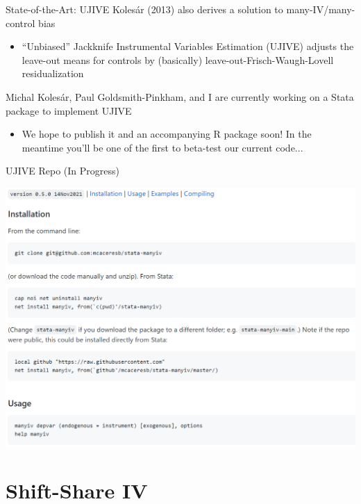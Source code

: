 \documentclass{beamer}
\begin{document}
\begin{frame}{State-of-the-Art: UJIVE}
 Koles\'{a}r (2013) also derives a solution to many-IV/many-control bias \smallskip
\begin{itemize}
\item ``Unbiased'' Jackknife Instrumental Variables Estimation (UJIVE) adjusts the leave-out means for controls by (basically) leave-out-Frisch-Waugh-Lovell residualization
\end{itemize}\bigskip\pause{}
Michal Koles\'{a}r, Paul Goldsmith-Pinkham, and I are currently working on a Stata package to implement UJIVE  \smallskip
\begin{itemize}
\item We hope to publish it and an accompanying R package soon! In the meantime you'll be one of the first to beta-test our current code...
\end{itemize}
\end{frame}

\begin{frame}{UJIVE Repo (In Progress)}
\begin{center}
\includegraphics[scale=0.45]{./lecture_includes/manyiv.png}
\end{center}
\end{frame}

\section{Shift-Share IV}
\end{document}
